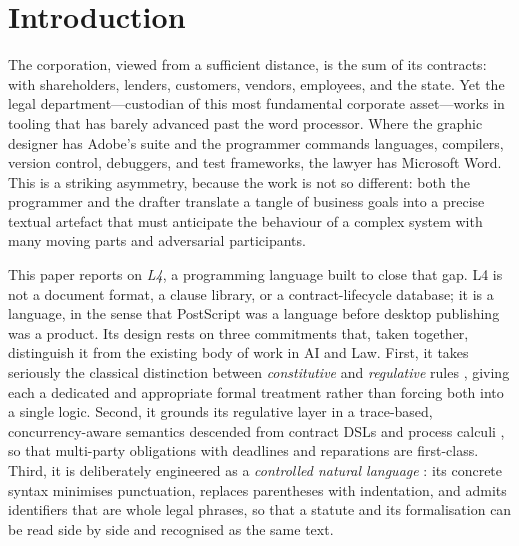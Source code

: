 \documentclass[sigconf,nonacm]{acmart}
\begin{document}

\maketitle

\section{Introduction}
The corporation, viewed from a sufficient distance, is the sum of its
contracts: with shareholders, lenders, customers, vendors, employees, and
the state. Yet the legal department---custodian of this most fundamental
corporate asset---works in tooling that has barely advanced past the word
processor. Where the graphic designer has Adobe's suite and the programmer
commands languages, compilers, version control, debuggers, and test
frameworks, the lawyer has Microsoft Word. This is a striking asymmetry,
because the work is not so different: both the programmer and the drafter
translate a tangle of business goals into a precise textual artefact that
must anticipate the behaviour of a complex system with many moving parts
and adversarial participants.

This paper reports on \emph{L4}, a programming language built to close that
gap. L4 is not a document format, a clause library, or a contract-lifecycle
database; it is a language, in the sense that PostScript was a language
before desktop publishing was a product. Its design rests on three
commitments that, taken together, distinguish it from the existing body of
work in AI and Law. First, it takes seriously the classical distinction
between \emph{constitutive} and \emph{regulative} rules
\cite{searle1969speech,hart1961concept}, giving each a dedicated and
appropriate formal treatment rather than forcing both into a single
logic. Second, it grounds its regulative layer in a trace-based,
concurrency-aware semantics descended from contract DSLs and process
calculi \cite{hvitved2011thesis,hoare1978csp}, so that multi-party
obligations with deadlines and reparations are first-class. Third, it is
deliberately engineered as a \emph{controlled natural language}
\cite{kuhn2014cnl}: its concrete syntax minimises punctuation, replaces
parentheses with indentation, and admits identifiers that are whole legal
phrases, so that a statute and its formalisation can be read side by side
and recognised as the same text.
\end{document}
